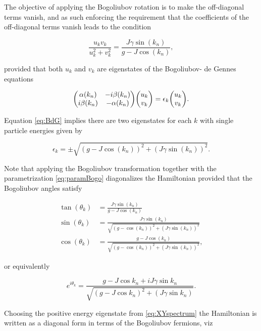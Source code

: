 The objective of applying the Bogoliubov rotation is to make the off-diagonal terms vanish, and as such enforcing the requirement that the coefficients of the off-diagonal terms vanish leads to the condition

\begin{equation}
    \frac{u_k v_k}{u_k^2 + v_k^2} =  \frac{J\gamma\sin(k_n)}{g-J\cos(k_n)},
\end{equation}

provided that both $u_k$ and $v_k$ are eigenstates of the Bogoliubov- de Gennes equations

\begin{align}
   \mqty(\alpha(k_n)& -i\beta(k_n) \\ i\beta(k_n) & -\alpha(k_n))\mqty(u_k\\v_k) = \epsilon_k \mqty(u_k\\v_k)\label{eq:BdG}.
\end{align}

Equation \eqref{eq:BdG} implies there are two eigenstates for each $k$ with single particle energies given by


\begin{equation}
    \epsilon_k = \pm \sqrt{(g- J\cos(k_n))^2 + (J\gamma \sin(k_n))^2}.\label{eq:XYspectrum}
\end{equation}




Note that applying the Bogoliubov transformation together with the parametrization \eqref{eq:paramBogo} diagonalizes the Hamiltonian provided that the Bogoliubov angles satisfy 

\begin{align}
        \tan(\theta_k) &= \frac{J\gamma\sin(k_n)}{g-J\cos(k_n)}\nonumber\\ 
        \sin(\theta_k) &= \frac{J\gamma\sin(k_n)}{\sqrt{(g- \cos(k_n))^2 + (J\gamma \sin(k_n))^2}}\\
        \cos(\theta_k) &= \frac{g - J\cos(k_n)}{\sqrt{(g- \cos(k_n))^2 +  (J\gamma \sin(k_n))^2}}\nonumber,\label{eq:BogoCond}
\end{align}

or equivalently

\begin{equation}
    e^{i \theta_k} = \frac{g-J\cos k_n + iJ\gamma \sin k_n}{\sqrt{(g-J\cos k_n)^2 + (J\gamma\sin k_n)}}.
\end{equation}

Choosing the positive energy eigenstate from \eqref{eq:XYspectrum} the Hamiltonian is written as a diagonal form in terms of the Bogoliubov fermions, viz

